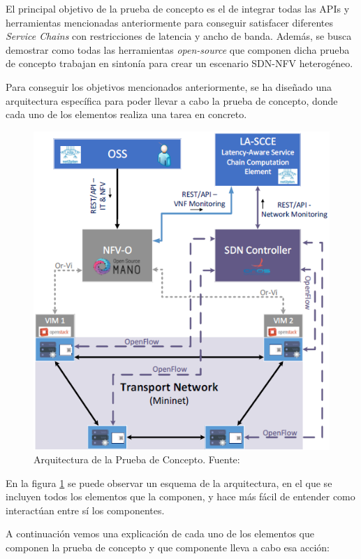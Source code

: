 El principal objetivo de la prueba de concepto es el de integrar todas las \acp{API} y herramientas mencionadas anteriormente para conseguir satisfacer diferentes \textit{Service Chains} con restricciones de latencia y ancho de banda. Además, se busca demostrar como todas las herramientas \textit{open-source} que componen dicha prueba de concepto trabajan en sintonía para crear un escenario \ac{SDN}-\ac{NFV} heterogéneo.

Para conseguir los objetivos mencionados anteriormente, se ha diseñado una arquitectura específica para poder llevar a cabo la prueba de concepto, donde cada uno de los elementos realiza una tarea en concreto.

\begin{figure}[!ht]
	\centering
	\includegraphics[width=0.7\linewidth]{imagenes/esquema_demo}
	\caption{Arquitectura de la Prueba de Concepto. Fuente:\cite{demoecocbib}}
	\label{fig:esquemademo}
\end{figure}

En la figura \ref{fig:esquemademo} se puede observar un esquema de la arquitectura, en el que se incluyen todos los elementos que la componen, y hace más fácil de entender como interactúan entre sí los componentes.

A continuación vemos una explicación de cada uno de los elementos que componen la prueba de concepto y que componente lleva a cabo esa acción:

